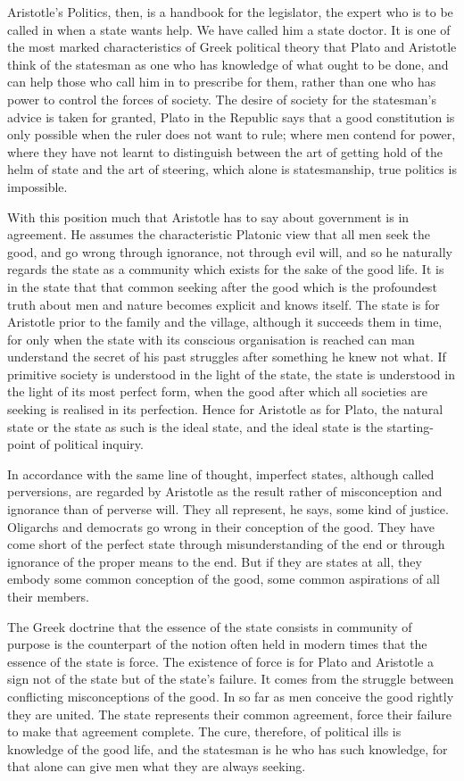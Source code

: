 Aristotle's Politics, then, is a handbook for the legislator, the expert
who is to be called in when a state wants help. We have called him a state
doctor. It is one of the most marked characteristics of Greek political
theory that Plato and Aristotle think of the statesman as one who has
knowledge of what ought to be done, and can help those who call him in to
prescribe for them, rather than one who has power to control the forces of
society. The desire of society for the statesman's advice is taken for
granted, Plato in the Republic says that a good constitution is only
possible when the ruler does not want to rule; where men contend for
power, where they have not learnt to distinguish between the art of
getting hold of the helm of state and the art of steering, which alone is
statesmanship, true politics is impossible.

With this position much that Aristotle has to say about government is in
agreement. He assumes the characteristic Platonic view that all men seek
the good, and go wrong through ignorance, not through evil will, and so he
naturally regards the state as a community which exists for the sake of
the good life. It is in the state that that common seeking after the good
which is the profoundest truth about men and nature becomes explicit and
knows itself. The state is for Aristotle prior to the family and the
village, although it succeeds them in time, for only when the state with
its conscious organisation is reached can man understand the secret of his
past struggles after something he knew not what. If primitive society is
understood in the light of the state, the state is understood in the light
of its most perfect form, when the good after which all societies are
seeking is realised in its perfection. Hence for Aristotle as for Plato,
the natural state or the state as such is the ideal state, and the ideal
state is the starting-point of political inquiry.

In accordance with the same line of thought, imperfect states, although
called perversions, are regarded by Aristotle as the result rather of
misconception and ignorance than of perverse will. They all represent, he
says, some kind of justice. Oligarchs and democrats go wrong in their
conception of the good. They have come short of the perfect state through
misunderstanding of the end or through ignorance of the proper means to
the end. But if they are states at all, they embody some common conception
of the good, some common aspirations of all their members.

The Greek doctrine that the essence of the state consists in community of
purpose is the counterpart of the notion often held in modern times that
the essence of the state is force. The existence of force is for Plato and
Aristotle a sign not of the state but of the state's failure. It comes
from the struggle between conflicting misconceptions of the good. In so
far as men conceive the good rightly they are united. The state represents
their common agreement, force their failure to make that agreement
complete. The cure, therefore, of political ills is knowledge of the good
life, and the statesman is he who has such knowledge, for that alone can
give men what they are always seeking.


